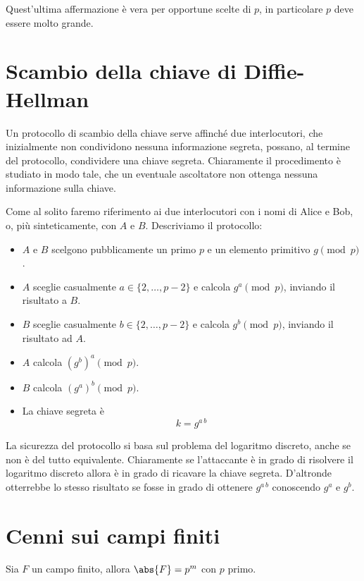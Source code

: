 	\begin{oss}
	Quest'ultima affermazione è vera per opportune scelte di \(p\), in particolare \(p\) deve essere molto grande.
	\end{oss}

	\section{Scambio della chiave di Diffie-Hellman}

	Un protocollo di scambio della chiave serve affinché due interlocutori, che inizialmente non condividono nessuna informazione segreta, possano, al termine del protocollo, condividere una chiave segreta.
	Chiaramente il procedimento è studiato in modo tale, che un eventuale ascoltatore non ottenga nessuna informazione sulla chiave.

	Come al solito faremo riferimento ai due interlocutori con i nomi di Alice e Bob, o, più sinteticamente, con \(A\) e \(B\). Descriviamo il protocollo:
	\begin{itemize}
		\item \(A\) e \(B\) scelgono pubblicamente un primo \(p\) e un elemento primitivo \(g\pmod{p}\).
		\item \(A\) sceglie casualmente \(a\in\{2,\ldots,p-2\}\) e calcola \(g^a\pmod{p}\), inviando il risultato a \(B\).
		\item \(B\) sceglie casualmente \(b\in\{2,\ldots,p-2\}\) e calcola \(g^b\pmod{p}\), inviando il risultato ad \(A\).
		\item \(A\) calcola \({(g^b)}^a\pmod{p}\).
		\item \(B\) calcola \({(g^a)}^b\pmod{p}\).
		\item La chiave segreta è
			\[
			k = g^{a\,b}
			\]
	\end{itemize}
	\noindent
	La sicurezza del protocollo si basa sul problema del logaritmo discreto, anche se non è del tutto equivalente.
	Chiaramente se l'attaccante è in grado di risolvere il logaritmo discreto allora è in grado di ricavare la chiave segreta.
	D'altronde otterrebbe lo stesso risultato se fosse in grado di ottenere \(g^{a\,b}\) conoscendo \(g^a\) e \(g^b\).
%
%
	\section{Cenni sui campi finiti}

	\begin{pr}
	Sia \(F\) un campo finito, allora \(\abs{F}=p^m\) con \(p\) primo.
	\end{pr}


